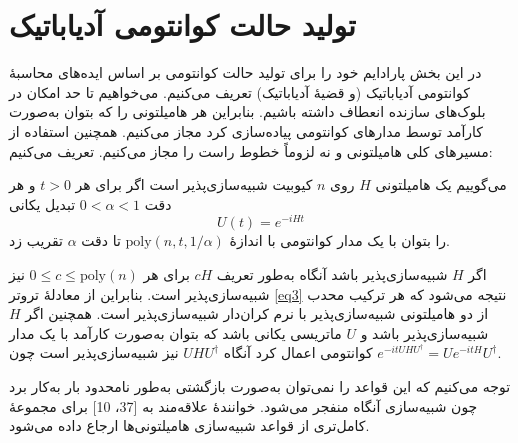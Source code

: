 \section{ تولید حالت کوانتومی آدیاباتیک}
در این بخش پارادایم خود را برای تولید حالت کوانتومی بر اساس ایده‌های محاسبهٔ کوانتومی آدیاباتیک (و قضیهٔ آدیاباتیک) تعریف می‌کنیم. می‌خواهیم تا حد امکان در بلوک‌های سازنده انعطاف داشته باشیم. بنابراین هر هامیلتونی را که بتوان به‌صورت کارآمد توسط مدارهای کوانتومی پیاده‌سازی کرد مجاز می‌کنیم. همچنین استفاده از مسیرهای کلی هامیلتونی و نه لزوماً خطوط راست را مجاز می‌کنیم. تعریف می‌کنیم:
\begin{defn}
	می‌گوییم یک هامیلتونی $H$ روی $n$ کیوبیت شبیه‌سازی‌پذیر است اگر برای هر $t > 0$ و هر دقت $0 < \alpha < 1$ تبدیل یکانی	
\begin{equation}
		U(t) = e^{-iHt}
\end{equation}
	را بتوان با یک مدار کوانتومی با اندازهٔ $\mathrm{poly}(n, t, 1/\alpha)$ تا دقت $\alpha$ تقریب زد.
\end{defn}
اگر $H$ شبیه‌سازی‌پذیر باشد آنگاه به‌طور تعریف $cH$ برای هر $0 \le c \le \mathrm{poly}(n)$ نیز شبیه‌سازی‌پذیر است. بنابراین از معادلهٔ تروتر 
\eqref{eq3}
 نتیجه می‌شود که هر ترکیب محدب از دو هامیلتونی شبیه‌سازی‌پذیر با نرم کران‌دار شبیه‌سازی‌پذیر است. همچنین اگر $H$ شبیه‌سازی‌پذیر باشد و $U$ ماتریسی یکانی باشد که بتوان به‌صورت کارآمد با یک مدار کوانتومی اعمال کرد آنگاه $U H U^\dagger$ نیز شبیه‌سازی‌پذیر است چون $e^{-it U H U^\dagger} = U e^{-itH} U^\dagger$.

توجه می‌کنیم که این قواعد را نمی‌توان به‌صورت بازگشتی به‌طور نامحدود بار به‌کار برد چون شبیه‌سازی آنگاه منفجر می‌شود. خوانندهٔ علاقه‌مند به [37، 10] برای مجموعهٔ کامل‌تری از قواعد شبیه‌سازی هامیلتونی‌ها ارجاع داده می‌شود.

